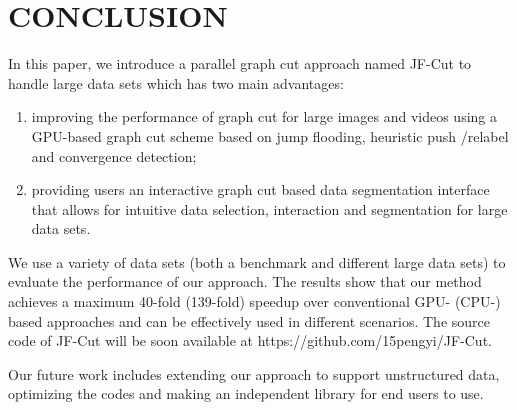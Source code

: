 
\section{CONCLUSION}
\label{section conclusion}

In this paper, we introduce a parallel graph cut approach named JF-Cut to handle large data sets which has two main advantages:

\begin{enumerate}
\item improving the performance of graph cut for large images and videos using a GPU-based graph cut scheme based on jump flooding, heuristic push /relabel and convergence detection;
\item providing users an interactive graph cut based data segmentation interface that allows for intuitive data selection, interaction and segmentation for large data sets.
\end{enumerate}

We use a variety of data sets (both a benchmark and different large data sets) to evaluate the performance of our approach.
The results show that our method achieves a maximum 40-fold (139-fold) speedup over conventional GPU- (CPU-) based approaches and can be effectively used in different scenarios.
The source code of JF-Cut will be soon available at https://github.com/15pengyi/JF-Cut.

Our future work includes extending our approach to support unstructured data, optimizing the codes and making an independent library for end users to use.
